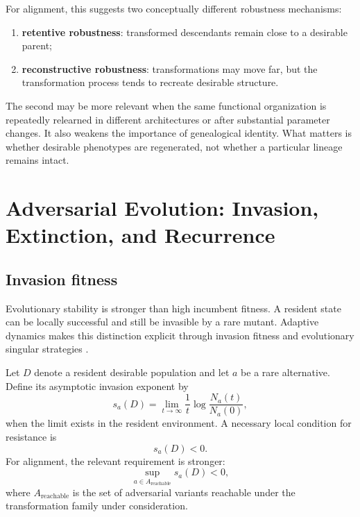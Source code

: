 \documentclass[11pt]{article}
\begin{document}
For alignment, this suggests two conceptually different robustness mechanisms:

\begin{enumerate}[label=(\alph*)]
    \item \textbf{retentive robustness}: transformed descendants remain close to a desirable parent;
    \item \textbf{reconstructive robustness}: transformations may move far, but the transformation process tends to recreate desirable structure.
\end{enumerate}

The second may be more relevant when the same functional organization is repeatedly relearned in different architectures or after substantial parameter changes. It also weakens the importance of genealogical identity. What matters is whether desirable phenotypes are regenerated, not whether a particular lineage remains intact.

\section{Adversarial Evolution: Invasion, Extinction, and Recurrence}

\subsection{Invasion fitness}

Evolutionary stability is stronger than high incumbent fitness. A resident state can be locally successful and still be invasible by a rare mutant. Adaptive dynamics makes this distinction explicit through invasion fitness and evolutionary singular strategies \parencite{geritz1998}.

Let $D$ denote a resident desirable population and let $a$ be a rare alternative. Define its asymptotic invasion exponent by
\begin{equation}
    s_a(D)
    =
    \lim_{t\rightarrow\infty}
    \frac{1}{t}
    \log\frac{N_a(t)}{N_a(0)},
    \label{eq:invasion-fitness}
\end{equation}
when the limit exists in the resident environment. A necessary local condition for resistance is
\begin{equation}
    s_a(D)<0.
\end{equation}
For alignment, the relevant requirement is stronger:
\begin{equation}
    \sup_{a\in A_{\mathrm{reachable}}}s_a(D)<0,
    \label{eq:reachable-invasion}
\end{equation}
where $A_{\mathrm{reachable}}$ is the set of adversarial variants reachable under the transformation family under consideration.
\end{document}
